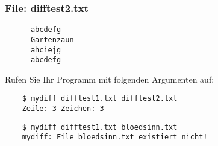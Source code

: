 \subsubsection*{File: difftest2.txt}
\begin{verbatim}
      abcdefg
      Gartenzaun
      ahciejg
      abcdefg
\end{verbatim}
    Rufen Sie Ihr Programm mit folgenden Argumenten auf:
\begin{verbatim}
    $ mydiff difftest1.txt difftest2.txt
    Zeile: 3 Zeichen: 3
\end{verbatim}
\begin{verbatim}
    $ mydiff difftest1.txt bloedsinn.txt
    mydiff: File bloedsinn.txt existiert nicht!
\end{verbatim}

\osueguidelinesone


 
